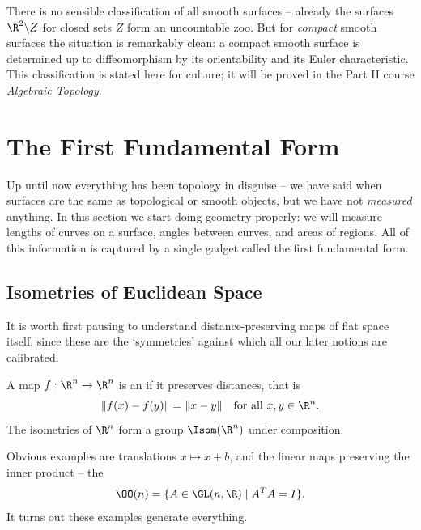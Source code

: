 \begin{remark}
    There is no sensible classification of all smooth surfaces -- already the surfaces $\R^2 \backslash Z$ for closed sets $Z$ form an uncountable zoo. But for \emph{compact} smooth surfaces the situation is remarkably clean: a compact smooth surface is determined up to diffeomorphism by its orientability and its Euler characteristic. This classification is stated here for culture; it will be proved in the Part II course \emph{Algebraic Topology}.
\end{remark}

\section{The First Fundamental Form}

Up until now everything has been topology in disguise -- we have said when surfaces are the same as topological or smooth objects, but we have not \emph{measured} anything. In this section we start doing geometry properly: we will measure lengths of curves on a surface, angles between curves, and areas of regions. All of this information is captured by a single gadget called the first fundamental form.

\subsection{Isometries of Euclidean Space}

It is worth first pausing to understand distance-preserving maps of flat space itself, since these are the `symmetries' against which all our later notions are calibrated.

\begin{definition}[Isometry]
    A map $f: \R^n \rightarrow \R^n$ is an  if it preserves distances, that is
    $$
    \|f(x) - f(y)\| = \|x - y\| \quad \text{for all } x, y \in \R^n.
    $$
    The isometries of $\R^n$ form a group $\Isom(\R^n)$ under composition.
\end{definition}

Obvious examples are translations $x \mapsto x + b$, and the linear maps preserving the inner product -- the 
$$
\OO(n) = \{A \in \GL(n, \R) \mid A^T A = I\}.
$$
It turns out these examples generate everything.

